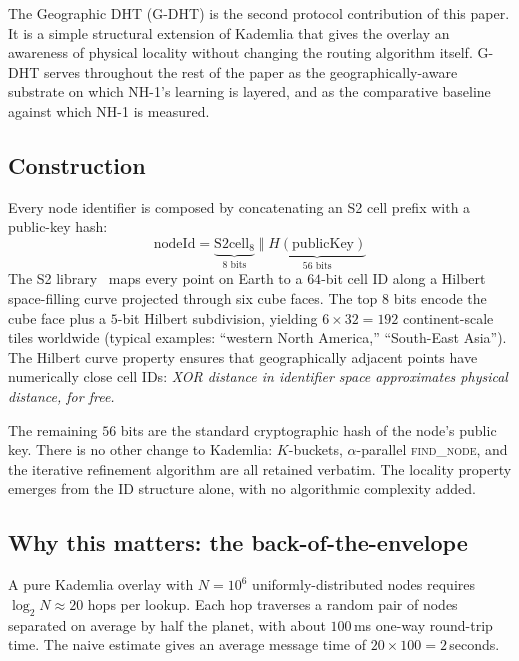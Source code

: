 \documentclass[conference]{IEEEtran}
\newcommand{\nhone}{NH-1\xspace}
\newcommand{\GDHT}{G-DHT\xspace}
\begin{document}
The Geographic DHT (\GDHT) is the second protocol contribution of this
paper. It is a simple structural extension of Kademlia that gives the
overlay an awareness of physical locality without changing the routing
algorithm itself. \GDHT serves throughout the rest of the paper as the
geographically-aware substrate on which \nhone's learning is layered,
and as the comparative baseline against which \nhone is measured.

\subsection{Construction}
\label{sec:gdht-construction}

Every node identifier is composed by concatenating an S2 cell prefix
with a public-key hash:
\begin{equation}
\mathrm{nodeId} = \underbrace{\mathrm{S2cell}_{8}}_{\text{8 bits}} \;\Vert\; \underbrace{H(\mathrm{publicKey})}_{\text{56 bits}}
\label{eq:gdht-id}
\end{equation}
The S2 library~\cite{s2geometry} maps every point on Earth to a $64$-bit
cell ID along a Hilbert space-filling curve projected through six cube
faces. The top $8$ bits encode the cube face plus a $5$-bit Hilbert
subdivision, yielding $6 \times 32 = 192$ continent-scale tiles
worldwide (typical examples: ``western North America,'' ``South-East
Asia''). The Hilbert curve property ensures that geographically
adjacent points have numerically close cell IDs: \emph{XOR distance
in identifier space approximates physical distance, for free.}

The remaining $56$ bits are the standard cryptographic hash of the
node's public key. There is no other change to Kademlia: $K$-buckets,
$\alpha$-parallel \textsc{find\_node}, and the iterative refinement
algorithm are all retained verbatim. The locality property emerges
from the ID structure alone, with no algorithmic complexity added.

\subsection{Why this matters: the back-of-the-envelope}
\label{sec:gdht-math}

A pure Kademlia overlay with $N = 10^6$ uniformly-distributed nodes
requires $\log_2 N \approx 20$ hops per lookup. Each hop traverses a
random pair of nodes separated on average by half the planet, with
about $100$\,ms one-way round-trip time. The naive estimate gives an
average message time of $20 \times 100 = 2$\,seconds.
\end{document}
